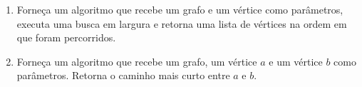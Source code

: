 \begin{enumerate}
  \item Forneça um algoritmo que recebe um grafo e um vértice como parâmetros, executa uma busca em largura e retorna uma lista de vértices na ordem em que foram percorridos.

  \item Forneça um algoritmo que recebe um grafo, um vértice $a$ e um vértice $b$ como parâmetros. Retorna o caminho mais curto entre $a$ e $b$.


\end{enumerate}


